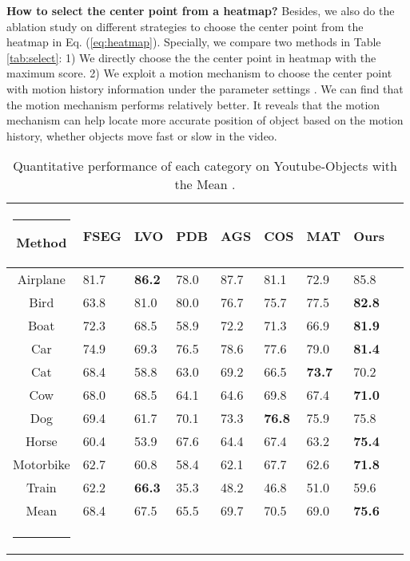 \documentclass[letterpaper]{article} \usepackage{aaai20}  \usepackage{times}  \usepackage{helvet} \usepackage{courier}  \usepackage[hyphens]{url}  \usepackage{graphicx} \urlstyle{rm} \def\UrlFont{\rm}  \usepackage{graphicx}  \frenchspacing  \setlength{\pdfpagewidth}{8.5in}  \setlength{\pdfpageheight}{11in}  \usepackage{amssymb}
\makeatletter
\def\hlinew#1{\noalign{\ifnum0=`}\fi\hrule \@height #1 \futurelet
   \reserved@a\@xhline}
\makeatother
\begin{document}
\noindent \textbf{How to select the center point from a heatmap?} 
Besides, we also do the ablation study on different strategies to choose the center point from the heatmap  in Eq. (\ref{eq:heatmap}). Specially, we compare two methods in Table \ref{tab:select}: 1) We directly choose the the center point in heatmap with the maximum score. 2) We exploit a motion mechanism \cite{xu2019mhp} to choose the center point with motion history information under the parameter settings . We can find that the motion mechanism performs relatively better. 
It reveals that
the motion mechanism can help locate more accurate position of object based on the motion history,
whether objects move fast or slow in the video.


\begin{table}[t!]
\small
    \centering
    \caption{Quantitative performance of each category on Youtube-Objects with the Mean .}
    \begin{tabular}{c||p{0.5cm}p{0.5cm}p{0.5cm}p{0.5cm}p{0.5cm}p{0.5cm}p{0.5cm}p{0.5cm}}
    \hlinew{1pt}
    Method & FSEG & LVO & PDB & AGS & COS & MAT & Ours \\ \hline \hline
    Airplane & 81.7 & \textbf{86.2} & 78.0 & 87.7 & 81.1 & 72.9 & 85.8 \\
    Bird & 63.8 & 81.0 & 80.0 & 76.7 & 75.7 & 77.5 & \textbf{82.8} \\
    Boat & 72.3 & 68.5 & 58.9 & 72.2 & 71.3 & 66.9 & \textbf{81.9} \\
    Car & 74.9 & 69.3 & 76.5 & 78.6 & 77.6 & 79.0 & \textbf{81.4} \\
    Cat & 68.4 & 58.8 & 63.0 & 69.2 & 66.5 & \textbf{73.7} & 70.2 \\
    Cow & 68.0 & 68.5 & 64.1 & 64.6 & 69.8 & 67.4 & \textbf{71.0} \\
    Dog & 69.4 & 61.7 & 70.1 & 73.3 & \textbf{76.8} & 75.9 & 75.8 \\
    Horse & 60.4 & 53.9 & 67.6 & 64.4 & 67.4 & 63.2 & \textbf{75.4} \\
    Motorbike & 62.7 & 60.8 & 58.4 & 62.1 & 67.7 & 62.6 & \textbf{71.8} \\
    Train & 62.2 & \textbf{66.3} & 35.3 & 48.2 & 46.8 & 51.0 & 59.6 \\ \hline
    Mean & 68.4 & 67.5 & 65.5 & 69.7 & 70.5 & 69.0 & \textbf{75.6} \\ \hlinew{1pt}
    \end{tabular}
    \label{tab:youtube}
    \vspace{-12pt}
\end{table}
\end{document}
